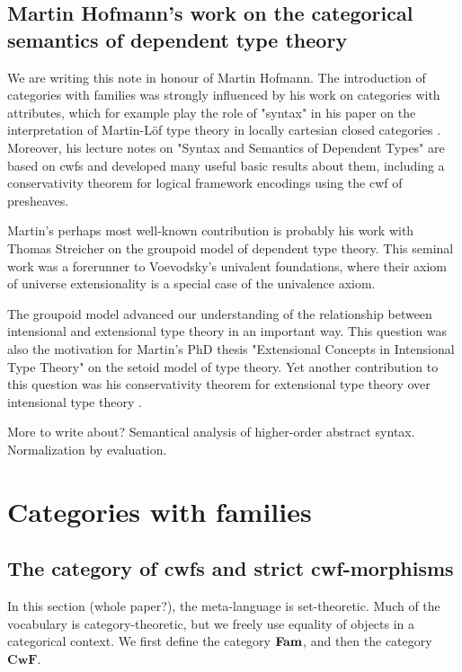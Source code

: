 \documentclass{lmcs}
\def\Cwf{\mathbf{CwF}}
\begin{document}
\subsection*{Martin Hofmann's work on the categorical semantics of dependent type theory}

We are writing this note in honour of Martin Hofmann. The introduction of categories with families was strongly influenced by his work on categories with attributes, which for example play the role of "syntax" in his paper on the interpretation of Martin-Löf type theory in locally cartesian closed categories \cite{hofmann:csl}. Moreover, his lecture notes on "Syntax and Semantics of Dependent Types" \cite{hofmann:cambridge} are based on cwfs and developed many useful basic results about them, including a conservativity theorem for logical framework encodings using the cwf of presheaves.

Martin's perhaps most well-known contribution is probably his work with Thomas Streicher on the groupoid model of dependent type theory. This seminal work was a forerunner to Voevodsky's univalent foundations, where their axiom of universe extensionality is a special case of the univalence axiom. 

The groupoid model advanced our understanding of the relationship between intensional and extensional type theory in an important way. This question was also the motivation for Martin's PhD thesis "Extensional Concepts in Intensional Type Theory" \cite{hofmann:phd} on the setoid model of type theory. Yet another contribution to this question was his conservativity theorem for extensional type theory over intensional type theory \cite{hofmann:conservativity}.

More to write about? Semantical analysis of higher-order abstract syntax. Normalization by evaluation.

\section{Categories with families}\label{sec:def_cwf}

\subsection{The category of cwfs and strict cwf-morphisms}

In this section (whole paper?), the meta-language is set-theoretic.
Much of the vocabulary is category-theoretic, but we freely use
equality of objects in a categorical context.
We first define the category $\textbf{Fam}$, and then the category $\Cwf$.
\end{document}
